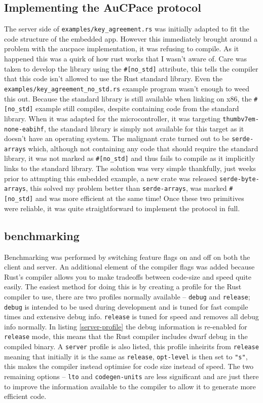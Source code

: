 \subsection{Implementing the AuCPace protocol}
The server side of \texttt{examples/key\_agreement.rs} was initially adapted to fit the code structure of the embedded app.
However this immediately brought around a problem with the \gls{aucpace} implementation, it was refusing to compile.
As it happened this was a quirk of how rust works that I wasn't aware of.
Care was taken to develop the library using the \verb|#[no_std]| attribute, this tells the compiler that this code isn't allowed to use the Rust standard library.
Even the \texttt{examples/key\_agreement\_no\_std.rs} example program wasn't enough to weed this out.
Because the standard library is still available when linking on x86, the \verb|#[no_std]| example still compiles, despite containing code from the standard library.
When it was adapted for the microcontroller, it was targeting \texttt{thumbv7em-none-eabihf}, the standard library is simply not available for this target as it doesn't have an operating system.
The malignant crate turned out to be \texttt{serde-arrays} which, although not containing any code that should require the standard library, it was not marked as \verb|#[no_std]| and thus fails to compile as it implicitly links to the standard library.
The solution was very simple thankfully, just weeks prior to attmpting this embedded example, a new crate was released \texttt{serde-byte-arrays}, this solved my problem better than \texttt{serde-arrays}, was marked \verb|#[no_std]| and was more efficient at the same time!
Once these two primitives were reliable, it was quite straightforward to implement the protocol in full.

\subsection{benchmarking}
Benchmarking was performed by switching feature flags on and off on both the client and server.
An additional element of the compiler flags was added because Rust's compiler allows you to make tradeoffs between code-size and speed quite easily.
The easiest method for doing this is by creating a profile for the Rust compiler to use, there are two profiles normally available -- \texttt{debug} and \texttt{release}; \texttt{debug} is intended to be used during development and is tuned for fast compile times and extensive debug info. \texttt{release} is tuned for speed and removes all debug info normally.
In listing \ref{server-profile} the debug information is re-enabled for \texttt{release} mode, this means that the Rust compiler includes \gls{dwarf} debug in the compiled binary.
A \texttt{server} profile is also listed, this profile inheirits from \texttt{release} meaning that initially it is the same as \texttt{release}, \texttt{opt-level} is then set to \texttt{"s"}, this makes the compiler instead optimise for code size instead of speed.
The two remaining options -- \texttt{lto} and \texttt{codegen-units} are less significant and are just there to improve the information available to the compiler to allow it to generate more efficient code.

